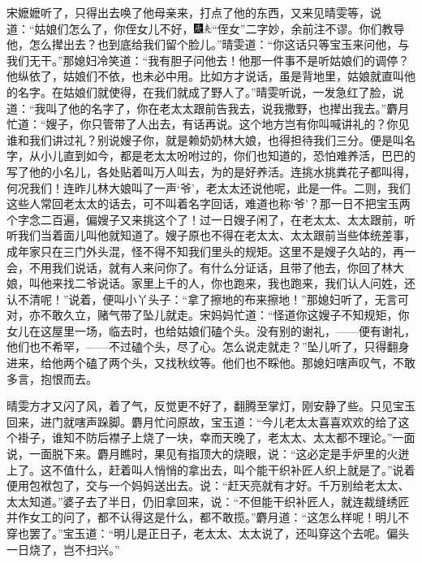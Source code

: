 宋嬷嬷听了，只得出去唤了他母亲来，打点了他的东西，又来见晴雯等，说道：``姑娘们怎么了，你侄女儿不好，{\includegraphics[width=3mm]{../Images/00004}\includegraphics[width=3mm]{../Images/00012}\footnotesize \kaishu ``侄女''二字妙，余前注不谬。}你们教导他，怎么撵出去？也到底给我们留个脸儿。''晴雯道：``你这话只等宝玉来问他，与我们无干。''那媳妇冷笑道：``我有胆子问他去！他那一件事不是听姑娘们的调停？他纵依了，姑娘们不依，也未必中用。比如方才说话，虽是背地里，姑娘就直叫他的名字。在姑娘们就使得，在我们就成了野人了。''晴雯听说，一发急红了脸，说道：``我叫了他的名字了，你在老太太跟前告我去，说我撒野，也撵出我去。''麝月忙道：``嫂子，你只管带了人出去，有话再说。这个地方岂有你叫喊讲礼的？你见谁和我们讲过礼？别说嫂子你，就是赖奶奶林大娘，也得担待我们三分。便是叫名字，从小儿直到如今，都是老太太吩咐过的，你们也知道的，恐怕难养活，巴巴的写了他的小名儿，各处贴着叫万人叫去，为的是好养活。连挑水挑粪花子都叫得，何况我们！连昨儿林大娘叫了一声`爷'，老太太还说他呢，此是一件。二则，我们这些人常回老太太的话去，可不叫着名字回话，难道也称`爷'？那一日不把宝玉两个字念二百遍，偏嫂子又来挑这个了！过一日嫂子闲了，在老太太、太太跟前，听听我们当着面儿叫他就知道了。嫂子原也不得在老太太、太太跟前当些体统差事，成年家只在三门外头混，怪不得不知我们里头的规矩。这里不是嫂子久站的，再一会，不用我们说话，就有人来问你了。有什么分证话，且带了他去，你回了林大娘，叫他来找二爷说话。家里上千的人，你也跑来，我也跑来，我们认人问姓，还认不清呢！''说着，便叫小丫头子：``拿了擦地的布来擦地！''那媳妇听了，无言可对，亦不敢久立，赌气带了坠儿就走。宋妈妈忙道：``怪道你这嫂子不知规矩，你女儿在这屋里一场，临去时，也给姑娘们磕个头。没有别的谢礼，------便有谢礼，他们也不希罕，------不过磕个头，尽了心。怎么说走就走？''坠儿听了，只得翻身进来，给他两个磕了两个头，又找秋纹等。他们也不睬他。那媳妇嗐声叹气，不敢多言，抱恨而去。

晴雯方才又闪了风，着了气，反觉更不好了，翻腾至掌灯，刚安静了些。只见宝玉回来，进门就嗐声跺脚。麝月忙问原故，宝玉道：``今儿老太太喜喜欢欢的给了这个褂子，谁知不防后襟子上烧了一块，幸而天晚了，老太太、太太都不理论。''一面说，一面脱下来。麝月瞧时，果见有指顶大的烧眼，说：``这必定是手炉里的火迸上了。这不值什么，赶着叫人悄悄的拿出去，叫个能干织补匠人织上就是了。''说着便用包袱包了，交与一个妈妈送出去。说：``赶天亮就有才好。千万别给老太太、太太知道。''婆子去了半日，仍旧拿回来，说：``不但能干织补匠人，就连裁缝绣匠并作女工的问了，都不认得这是什么，都不敢揽。''麝月道：``这怎么样呢！明儿不穿也罢了。''宝玉道：``明儿是正日子，老太太、太太说了，还叫穿这个去呢。偏头一日烧了，岂不扫兴。''

